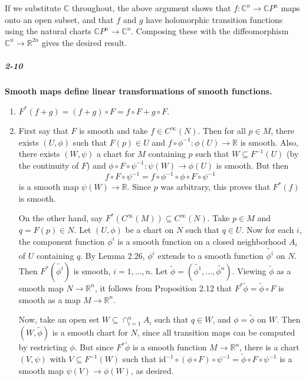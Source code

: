 \documentclass[10pt,letter]{article}
\begin{document}
If we substitute $\mathbb{C}$ throughout, the above argument shows that $f: \mathbb{C}^n \rightarrow \mathbb{C}P^n$ maps onto an open subset, and that $f$ and $g$ have holomorphic transition functions using the natural charts $\mathbb{C}P^n \rightarrow \mathbb{C}^n$. Composing these with the diffeomorphism $\mathbb{C}^n \rightarrow \mathbb{R}^{2n}$ gives the desired result. 

\subparagraph{2-10} \textbf{Smooth maps define linear transformations of smooth functions.}
\begin{enumerate}[label=(\alph*)]
\item $F^*(f+g) = (f+g) \circ F = f \circ F + g \circ F$.
\item First say that $F$ is smooth and take $f \in C^{\infty}(N)$. Then for all $p \in M$, there exists $(U,\phi)$ such that $F(p) \in U$ and $f \circ \phi^{-1}: \phi(U) \rightarrow \mathbb{R}$ is smooth. Also, there exists $(W,\psi)$ a chart for $M$ containing $p$ such that $W \subseteq F^{-1}(U)$ (by the continuity of $F$) and $\phi \circ F \circ \psi^{-1}: \psi(W) \rightarrow \phi(U)$ is smooth. But then
\begin{equation*}
f \circ F \circ \psi^{-1} = f \circ \phi^{-1} \circ \phi \circ F \circ \psi^{-1} 
\end{equation*}
is a smooth map $\psi(W) \rightarrow \mathbb{R}$. Since $p$ was arbitrary, this proves that $F^{\ast}(f)$ is smooth. 

On the other hand, say $F^{\ast}(C^{\infty}(M)) \subseteq C^{\infty}(N)$. Take $p \in M$ and $q = F(p) \in N$. Let $(U,\phi)$ be a chart on $N$ such that $q \in U$. Now for each $i$, the component function $\phi^i$ is a smooth function on a closed neighborhood $A_i$ of $U$ containing $q$. By Lemma 2.26, $\phi^i$ extends to a smooth function $\tilde{\phi^i}$ on $N$. Then $F^{\ast}(\tilde{\phi^i})$ is smooth, $i=1,...,n$. Let $\tilde{\phi} = (\tilde{\phi^1},...,\tilde{\phi^n})$. Viewing $\tilde{\phi}$ as a smooth map $N \rightarrow \mathbb{R}^n$, it follows from Proposition 2.12 that $F^\ast \tilde{\phi} = \tilde{\phi} \circ F$ is smooth as a map $M \rightarrow \mathbb{R}^n$. 

Now, take an open set $W \subseteq \cap_{i=1}^n A_i$ such that $q \in W$, and $\phi = \tilde{\phi}$ on $W$. Then $(W,\tilde{\phi})$ is a smooth chart for $N$, since all transition maps can be computed by restricting $\phi$. But since $F^\ast \tilde{\phi}$ is a smooth function $M \rightarrow \mathbb{R}^n$, there is a chart $(V,\psi)$ with $V \subseteq F^{-1}(W)$ such that $\text{id}^{-1} \circ (\phi \circ F) \circ \psi^{-1} = \tilde{\phi} \circ F \circ \psi^{-1}$ is a smooth map $\psi(V) \rightarrow \phi(W)$, as desired. 


\end{enumerate}
\end{document}
